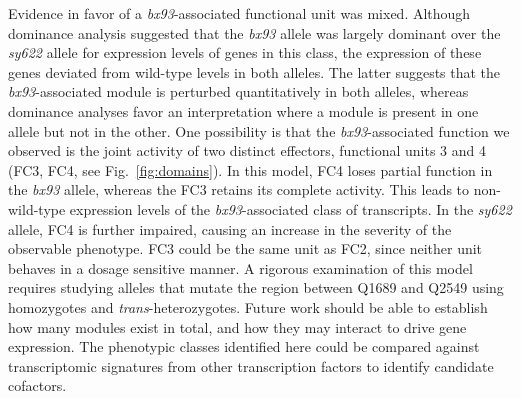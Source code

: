 \documentclass[10pt, twocolumn]{article}
\begin{document}

Evidence in favor of a \emph{bx93}-associated functional unit was mixed.
Although dominance analysis suggested that the \emph{bx93} allele was largely
dominant over the \emph{sy622} allele for expression levels of genes in this
class, the expression of these genes deviated from wild-type levels in both
alleles. The latter suggests that the \emph{bx93}-associated module is perturbed
quantitatively in both alleles, whereas dominance analyses favor an
interpretation where a module is present in one allele but not in the other.
One possibility is that the \emph{bx93}-associated function we observed is the
joint activity of two distinct effectors, functional units 3 and 4 (FC3, FC4,
see Fig.~\ref{fig:domains}). In this model, FC4 loses partial function in the
\emph{bx93} allele, whereas the FC3 retains its complete activity. This leads to
non-wild-type expression levels of the \emph{bx93}-associated class of
transcripts. In the \emph{sy622} allele, FC4 is further impaired, causing an
increase in the severity of the observable phenotype. FC3 could be the same unit
as FC2, since neither unit behaves in a dosage sensitive manner. A rigorous
examination of this model requires studying alleles that mutate the region
between Q1689 and Q2549 using homozygotes and \emph{trans}-heterozygotes. Future
work should be able to establish how many modules exist in total, and how they
may interact to drive gene expression. The phenotypic classes identified here
could be compared against transcriptomic signatures from other transcription
factors to identify candidate cofactors.
\end{document}
